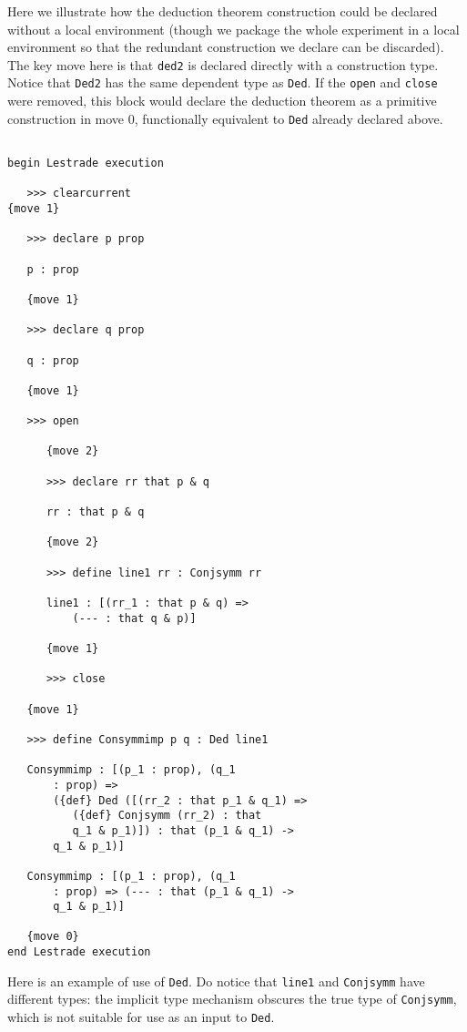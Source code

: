 \documentclass[12pt]{article}
\begin{document}
Here we illustrate how the deduction theorem construction could be declared without a local environment (though we package the whole experiment in a local environment so that the redundant  construction we declare can be discarded).  The key move here is that {\tt ded2} is declared directly with a construction type.   Notice that {\tt Ded2} has the same dependent type as {\tt Ded}.  If the {\tt open} and {\tt close} were removed, this block would declare the deduction theorem as a primitive construction in move 0, functionally equivalent to {\tt Ded} already declared above.

\begin{verbatim}

begin Lestrade execution

   >>> clearcurrent
{move 1}

   >>> declare p prop

   p : prop

   {move 1}

   >>> declare q prop

   q : prop

   {move 1}

   >>> open

      {move 2}

      >>> declare rr that p & q

      rr : that p & q

      {move 2}

      >>> define line1 rr : Conjsymm rr

      line1 : [(rr_1 : that p & q) => 
          (--- : that q & p)]

      {move 1}

      >>> close

   {move 1}

   >>> define Consymmimp p q : Ded line1

   Consymmimp : [(p_1 : prop), (q_1 
       : prop) => 
       ({def} Ded ([(rr_2 : that p_1 & q_1) => 
          ({def} Conjsymm (rr_2) : that 
          q_1 & p_1)]) : that (p_1 & q_1) -> 
       q_1 & p_1)]

   Consymmimp : [(p_1 : prop), (q_1 
       : prop) => (--- : that (p_1 & q_1) -> 
       q_1 & p_1)]

   {move 0}
end Lestrade execution
\end{verbatim}

Here is an example of use of {\tt Ded}.  Do notice that {\tt line1} and {\tt Conjsymm} have different types:  the implicit type mechanism obscures the true type of {\tt Conjsymm}, which is not suitable for use as an input to {\tt Ded}.
\end{document}
